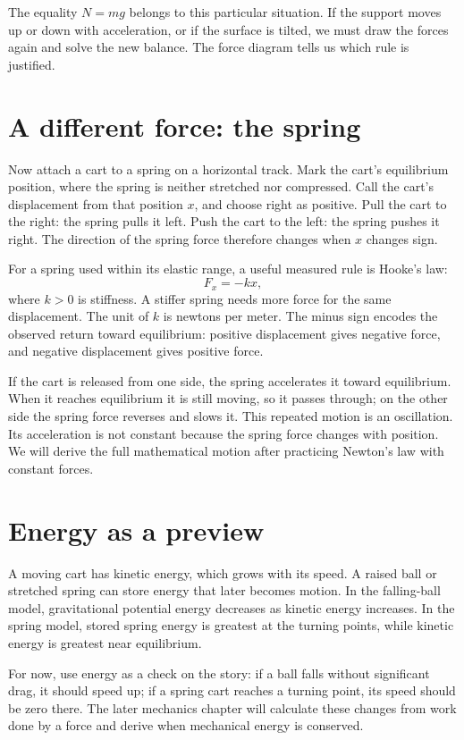 \documentclass[11pt,oneside]{book}
\theoremstyle{reviewstyle}
\begin{document}
The equality $N=mg$ belongs to this particular situation. If the support moves up or down with acceleration, or if the surface is tilted, we must draw the forces again and solve the new balance. The force diagram tells us which rule is justified.

\section{A different force: the spring}
Now attach a cart to a spring on a horizontal track. Mark the cart's equilibrium position, where the spring is neither stretched nor compressed. Call the cart's displacement from that position $x$, and choose right as positive. Pull the cart to the right: the spring pulls it left. Push the cart to the left: the spring pushes it right. The direction of the spring force therefore changes when $x$ changes sign.

For a spring used within its elastic range, a useful measured rule is Hooke's law:
\begin{equation}
F_x=-kx,
\end{equation}
where $k>0$ is stiffness. A stiffer spring needs more force for the same displacement. The unit of $k$ is newtons per meter. The minus sign encodes the observed return toward equilibrium: positive displacement gives negative force, and negative displacement gives positive force.

If the cart is released from one side, the spring accelerates it toward equilibrium. When it reaches equilibrium it is still moving, so it passes through; on the other side the spring force reverses and slows it. This repeated motion is an oscillation. Its acceleration is not constant because the spring force changes with position. We will derive the full mathematical motion after practicing Newton's law with constant forces.

\section{Energy as a preview}
A moving cart has kinetic energy, which grows with its speed. A raised ball or stretched spring can store energy that later becomes motion. In the falling-ball model, gravitational potential energy decreases as kinetic energy increases. In the spring model, stored spring energy is greatest at the turning points, while kinetic energy is greatest near equilibrium.

For now, use energy as a check on the story: if a ball falls without significant drag, it should speed up; if a spring cart reaches a turning point, its speed should be zero there. The later mechanics chapter will calculate these changes from work done by a force and derive when mechanical energy is conserved.
\end{document}

